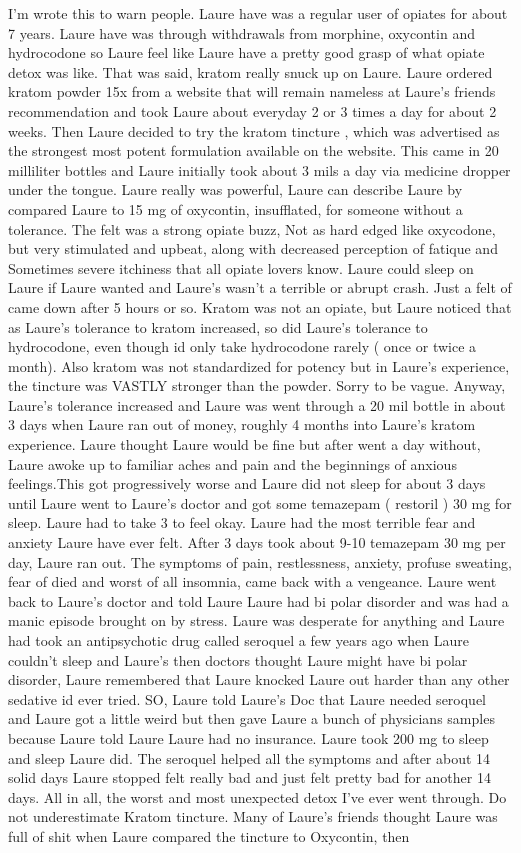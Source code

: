 \documentclass[12pt]{book}
\begin{document}
I'm wrote this to warn people. Laure have was a regular user of opiates for about 7 years. Laure have was through withdrawals from morphine, oxycontin and hydrocodone so Laure feel like Laure have a pretty good grasp of what opiate detox was like. That was said, kratom really snuck up on Laure. Laure ordered kratom powder 15x from a website that will remain nameless at Laure's friends recommendation and took Laure about everyday 2 or 3 times a day for about 2 weeks. Then Laure decided to try the kratom tincture , which was advertised as the strongest most potent formulation available on the website. This came in 20 milliliter bottles and Laure initially took about 3 mils a day via medicine dropper under the tongue. Laure really was powerful, Laure can describe Laure by compared Laure to 15 mg of oxycontin, insufflated, for someone without a tolerance. The felt was a strong opiate buzz, Not as hard edged like oxycodone, but very stimulated and upbeat, along with decreased perception of fatique and Sometimes severe itchiness that all opiate lovers know. Laure could sleep on Laure if Laure wanted and Laure's wasn't a terrible or abrupt crash. Just a felt of came down after 5 hours or so. Kratom was not an opiate, but Laure noticed that as Laure's tolerance to kratom increased, so did Laure's tolerance to hydrocodone, even though id only take hydrocodone rarely ( once or twice a month). Also kratom was not standardized for potency but in Laure's experience, the tincture was VASTLY stronger than the powder. Sorry to be vague. Anyway, Laure's tolerance increased and Laure was went through a 20 mil bottle in about 3 days when Laure ran out of money, roughly 4 months into Laure's kratom experience. Laure thought Laure would be fine but after went a day without, Laure awoke up to familiar aches and pain and the beginnings of anxious feelings.This got progressively worse and Laure did not sleep for about 3 days until Laure went to Laure's doctor and got some temazepam ( restoril ) 30 mg for sleep. Laure had to take 3 to feel okay. Laure had the most terrible fear and anxiety Laure have ever felt. After 3 days took about 9-10 temazepam 30 mg per day, Laure ran out. The symptoms of pain, restlessness, anxiety, profuse sweating, fear of died and worst of all insomnia, came back with a vengeance. Laure went back to Laure's doctor and told Laure Laure had bi polar disorder and was had a manic episode brought on by stress. Laure was desperate for anything and Laure had took an antipsychotic drug called seroquel a few years ago when Laure couldn't sleep and Laure's then doctors thought Laure might have bi polar disorder, Laure remembered that Laure knocked Laure out harder than any other sedative id ever tried. SO, Laure told Laure's Doc that Laure needed seroquel and Laure got a little weird but then gave Laure a bunch of physicians samples because Laure told Laure Laure had no insurance. Laure took 200 mg to sleep and sleep Laure did. The seroquel helped all the symptoms and after about 14 solid days Laure stopped felt really bad and just felt pretty bad for another 14 days. All in all, the worst and most unexpected detox I've ever went through. Do not underestimate Kratom tincture. Many of Laure's friends thought Laure was full of shit when Laure compared the tincture to Oxycontin, then 
\end{document}
